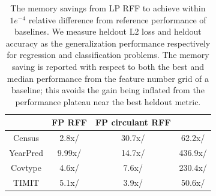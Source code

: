 
\begin{table}
	\centering
	\begin{tabular}{c c c c}
		\hline
		& FP RFF & FP circulant RFF & \Nystrom \\
		\hline
		\hline
		Census & 2.8x/ & 30.7x/ & 62.2x/ \\
		YearPred & 9.99x/ & 14.7x/ & 436.9x/ \\ 
		Covtype & 4.6x/ & 7.6x/ & 230.4x/ \\ 
		TIMIT & 5.1x/ & 3.9x/ & 50.6x/ \\ 
		\hline
	\end{tabular}
	\caption{The memory savings from LP RFF to achieve within $1e^{-4}$ relative difference from reference performance of baselines. We measure heldout L2 loss and heldout accuracy as the generalization performance respectively for regression and classification problems. The memory saving is reported with respect to both the best and median performance from the feature number grid of a baseline; this avoids the gain being inflated from the performance plateau near the best heldout metric. }
	\label{fig:mem_saving}
\end{table}